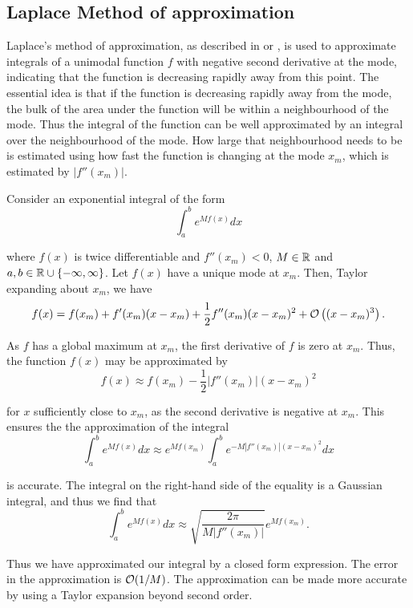 \subsection{Laplace Method of approximation}
\label{sec:laplace_approximation}

Laplace's method of approximation, as described in \cite{butler_2007} or
\cite{MacKay:2002:ITI:971143}, is used to approximate integrals of a unimodal
function $f$ with negative second derivative at the mode, indicating that the
function is decreasing rapidly away from this point. The essential idea is that
if the function is decreasing rapidly away from the mode, the bulk of the area
under the function will be within a neighbourhood of the mode. Thus the integral
of the function can be well approximated by an integral over the neighbourhood
of the mode. How large that neighbourhood needs to be is estimated using how
fast the function is changing at the mode $x_m$, which is estimated by
$|f''(x_m)|$.

Consider an exponential integral of the form
$$
	\int_a^b e^{M f(x)} dx
$$

\noindent where $f(x)$ is twice differentiable and $f''(x_m) < 0$, $M \in {\mathbb{R}}$
and $a, b \in {\mathbb{R}} \cup \{-\infty, \infty\}$. Let $f(x)$ have a unique mode at
$x_m$. Then, Taylor expanding about $x_m$, we have
$$
	f(x) = f(x_m) + f'(x_m) (x - x_m) + \frac{1}{2} f''(x_m) (x - x_m)^2 + \mathcal{O}\left((x - x_m)^3\right).
$$

\noindent As $f$ has a global maximum at $x_m$, the first derivative of $f$ is
zero at $x_m$. Thus, the function $f(x)$ may be approximated by
$$
	f(x) \approx f(x_m) - \frac{1}{2} |f''(x_m)| (x - x_m)^2
$$

\noindent for $x$ sufficiently close to $x_m$, as the second derivative is
negative at $x_m$. This ensures the the approximation of the integral
$$
	\int_a^b e^{M f(x)} dx \approx e^{M f(x_m)} \int_a^b e^{-M |f''(x_m)|(x - x_m)^2} dx
$$

\noindent is accurate. The integral on the right-hand side of the equality is a
Gaussian integral, and thus we find that
$$
	\int_a^b e^{M f(x)} dx \approx \sqrt{\frac{2 \pi}{M |f''(x_m)|}} e^{M f(x_m)}.
$$

\noindent Thus we have approximated our integral by a closed form expression.
The error in the approximation is $\mathcal{O}(1/M)$. The approximation can be made
more accurate by using a Taylor expansion beyond second order.

